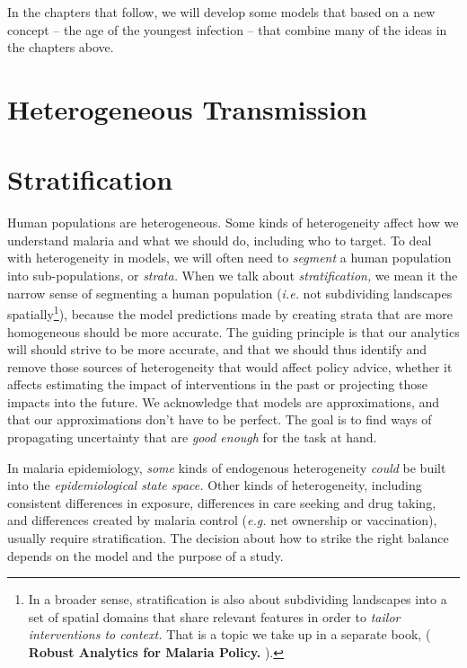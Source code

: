 \documentclass[
]{book}
\begin{document}
In the chapters that follow, we will develop some models that based on a new concept -- the age of the youngest infection -- that combine many of the ideas in the chapters above.

\hypertarget{heterogeneous-transmission}{%
\section{Heterogeneous Transmission}\label{heterogeneous-transmission}}

\hypertarget{stratification}{%
\section{Stratification}\label{stratification}}

Human populations are heterogeneous. Some kinds of heterogeneity affect how we understand malaria and what we should do, including who to target. To deal with heterogeneity in models, we will often need to \emph{segment} a human population into sub-populations, or \emph{strata.} When we talk about \emph{stratification,} we mean it the narrow sense of segmenting a human population (\emph{i.e.} not subdividing landscapes spatially\footnote{In a broader sense, stratification is also about subdividing landscapes into a set of spatial domains that share relevant features in order to \emph{tailor interventions to context.} That is a topic we take up in a separate book, ( \textbf{Robust Analytics for Malaria Policy.} ).}), because the model predictions made by creating strata that are more homogeneous should be more accurate. The guiding principle is that our analytics will should strive to be more accurate, and that we should thus identify and remove those sources of heterogeneity that would affect policy advice, whether it affects estimating the impact of interventions in the past or projecting those impacts into the future. We acknowledge that models are approximations, and that our approximations don't have to be perfect. The goal is to find ways of propagating uncertainty that are \emph{good enough} for the task at hand.

In malaria epidemiology, \emph{some} kinds of endogenous heterogeneity \emph{could} be built into the \emph{epidemiological state space.} Other kinds of heterogeneity, including consistent differences in exposure, differences in care seeking and drug taking, and differences created by malaria control (\emph{e.g.} net ownership or vaccination), usually require stratification. The decision about how to strike the right balance depends on the model and the purpose of a study.
\end{document}
